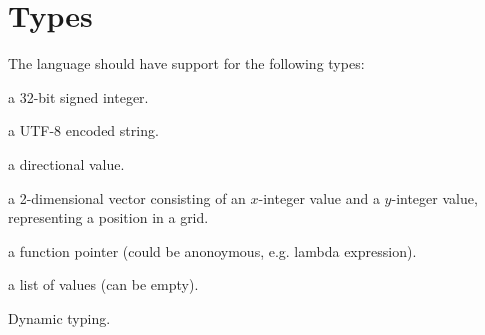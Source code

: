 \section{Types}

The language should have support for the following types:

\begin{description}[noitemsep]
\item[Integer] a 32-bit signed integer.
\item[String] a UTF-8 encoded string.
\item[Direction] a directional value.
\item[Coordinate] a 2-dimensional vector consisting of an $x$-integer value and
a $y$-integer value, representing a position in a grid.
\item[Function] a function pointer (could be anonoymous, e.g. lambda expression).
\item[List] a list of values (can be empty).
\item[Action]
\end{description}

Dynamic typing.


